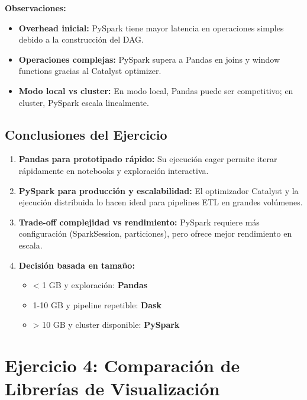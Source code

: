 \documentclass[12pt]{src/formato_utem}
\begin{document}
\textbf{Observaciones:}
\begin{itemize}
    \item \textbf{Overhead inicial:} PySpark tiene mayor latencia en operaciones simples debido a la construcción del DAG.
    \item \textbf{Operaciones complejas:} PySpark supera a Pandas en joins y window functions gracias al Catalyst optimizer.
    \item \textbf{Modo local vs cluster:} En modo local, Pandas puede ser competitivo; en cluster, PySpark escala linealmente.
\end{itemize}

\subsection{Conclusiones del Ejercicio}

\begin{enumerate}
    \item \textbf{Pandas para prototipado rápido:} Su ejecución eager permite iterar rápidamente en notebooks y exploración interactiva.
    
    \item \textbf{PySpark para producción y escalabilidad:} El optimizador Catalyst y la ejecución distribuida lo hacen ideal para pipelines ETL en grandes volúmenes.
    
    \item \textbf{Trade-off complejidad vs rendimiento:} PySpark requiere más configuración (SparkSession, particiones), pero ofrece mejor rendimiento en escala.
    
    \item \textbf{Decisión basada en tamaño:}
    \begin{itemize}
        \item < 1 GB y exploración: \textbf{Pandas}
        \item 1-10 GB y pipeline repetible: \textbf{Dask}
        \item > 10 GB y cluster disponible: \textbf{PySpark}
    \end{itemize}
\end{enumerate}

\newpage

\section{Ejercicio 4: Comparación de Librerías de Visualización}
\end{document}

